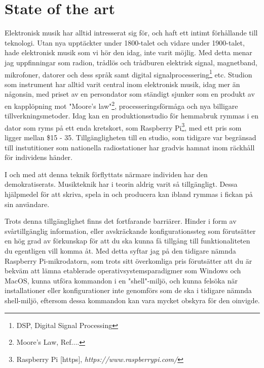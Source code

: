 \documentclass{article}
\begin{document}







\section{State of the art}

Elektronisk musik har alltid intresserat sig för, och haft ett intimt förhållande till teknologi. Utan nya
upptäckter under 1800-talet och vidare under 1900-talet, hade elektronisk musik som vi hör den idag, inte
varit möjlig. Med detta menar jag uppfinningar som radion, trådlös och trådburen elektrisk signal,
magnetband, mikrofoner, datorer och dess språk samt digital signalprocessering\footnote{DSP, Digital Signal
Processing} etc. Studion som instrument har alltid varit central inom elektronisk musik, idag mer än
någonsin, med priset av en persondator som ständigt sjunker som en produkt av en kapplöpning mot "Moore's
law"\footnote{Moore's Law, Ref....}, processeringsförmåga och nya billigare tillverkningsmetoder. Idag kan
en produktionsstudio för hemmabruk rymmas i en dator som ryms på ett enda kretskort, som Raspberry
Pi\footnote{Raspberry Pi [https], \emph{https://www.raspberrypi.com/}}, med ett pris som ligger mellan \$15
- 35. Tillgängligheten till en studio, som tidigare var begränsad till instutitioner som nationella
radiostationer har gradvis hamnat inom räckhåll för individens händer.

I och med att denna teknik förflyttats närmare individen har den demokratiserats. Musikteknik har i teorin
aldrig varit så tillgängligt. Dessa hjälpmedel för att skriva, spela in och producera kan ibland rymmas i
fickan på sin användare.

Trots denna tillgänglighet finns det fortfarande barriärer. Hinder i form av svårtillgänglig information,
eller avskräckande konfigurationssteg som förutsätter en hög grad av förkunskap för att du ska kunna få
tillgång till funktionaliteten du egentligen vill komma åt. Med detta syftar jag på den tidigare nämnda
Raspberry Pi-mikrodatorn, som trots sitt överkomliga pris förutsätter att du är bekväm att lämna etablerade
operativsystemsparadigmer som Windows och MacOS, kunna utföra kommandon i en "shell"-miljö, och kunna
felsöka när installationer eller konfigurationer inte genomförs som de ska i tidigare nämnda shell-miljö,
eftersom dessa kommandon kan vara mycket obskyra för den oinvigde. 
	
\end{document}
